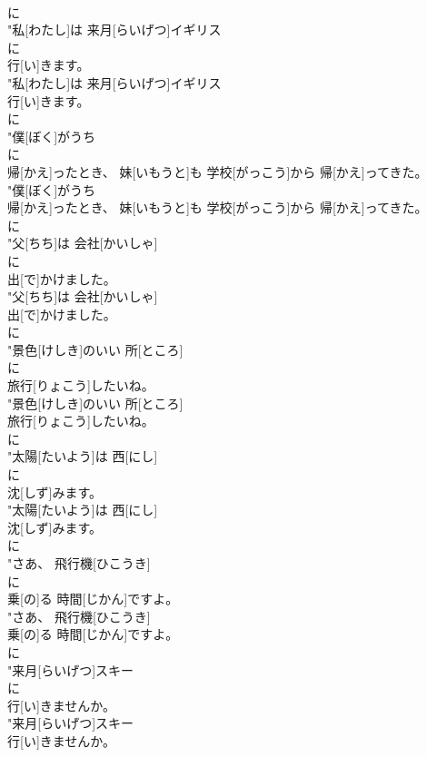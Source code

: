 \documentclass[8pt]{extreport}
\begin{document}
\begin{CJK}{UTF8}{min}
\\	に
\\	"私[わたし]は 来月[らいげつ]イギリス
\\	に
\\	行[い]きます。
\\	"私[わたし]は 来月[らいげつ]イギリス
\\	行[い]きます。
\\	に
\\	"僕[ぼく]がうち
\\	に
\\	帰[かえ]ったとき、 妹[いもうと]も 学校[がっこう]から 帰[かえ]ってきた。
\\	"僕[ぼく]がうち
\\	帰[かえ]ったとき、 妹[いもうと]も 学校[がっこう]から 帰[かえ]ってきた。
\\	に
\\	"父[ちち]は 会社[かいしゃ]
\\	に
\\	出[で]かけました。
\\	"父[ちち]は 会社[かいしゃ]
\\	出[で]かけました。
\\	に
\\	"景色[けしき]のいい 所[ところ]
\\	に
\\	旅行[りょこう]したいね。
\\	"景色[けしき]のいい 所[ところ]
\\	旅行[りょこう]したいね。
\\	に
\\	"太陽[たいよう]は 西[にし]
\\	に
\\	沈[しず]みます。
\\	"太陽[たいよう]は 西[にし]
\\	沈[しず]みます。
\\	に
\\	"さあ、 飛行機[ひこうき]
\\	に
\\	乗[の]る 時間[じかん]ですよ。
\\	"さあ、 飛行機[ひこうき]
\\	乗[の]る 時間[じかん]ですよ。
\\	に
\\	"来月[らいげつ]スキー
\\	に
\\	行[い]きませんか。
\\	"来月[らいげつ]スキー
\\	行[い]きませんか。

\end{CJK}
\end{document}
